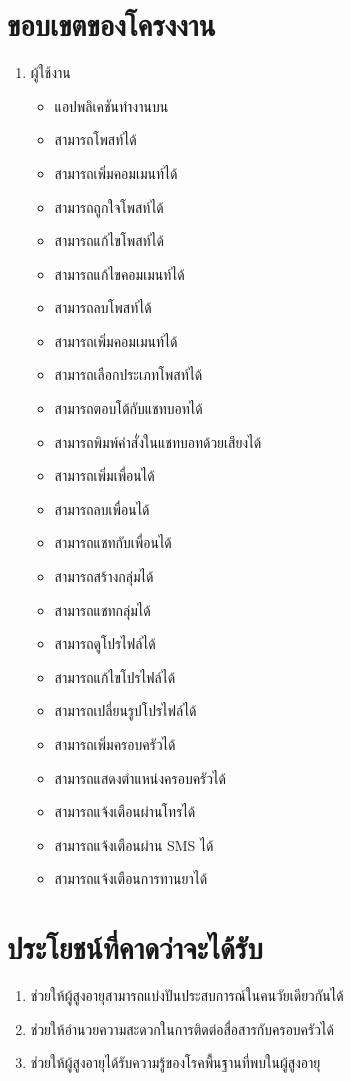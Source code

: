 \section{ขอบเขตของโครงงาน}
\begin{enumerate}[label=1.3.\arabic*]
	\item ผู้ใช้งาน
	 \begin{itemize}
		 	\item แอปพลิเคชันทำงานบน
		 	\item สามารถโพสท์ได้
		 	\item สามารถเพิ่มคอมเมนท์ได้
		 	\item สามารถถูกใจโพสท์ได้
		 	\item สามารถแก้ไขโพสท์ได้
		 	\item สามารถแก้ไขคอมเมนท์ได้
		 	\item สามารถลบโพสท์ได้
		 	\item สามารถเพิ่มคอมเมนท์ได้
		 	\item สามารถเลือกประเภทโพสท์ได้
		 	\item สามารถตอบโต้กับแชทบอทได้
		 	\item สามารถพิมพ์คำสั่งในแชทบอทด้วยเสียงได้
		 	\item สามารถเพิ่มเพื่อนได้
		 	\item สามารถลบเพื่อนได้
		 	\item สามารถแชทกับเพื่อนได้
		 	\item สามารถสร้างกลุ่มได้
		 	\item สามารถแชทกลุ่มได้
		 	\item สามารถดูโปรไฟล์ได้
		 	\item สามารถแก้ไขโปรไฟล์ได้
		 	\item สามารถเปลี่ยนรูปโปรไฟล์ได้
		 	\item สามารถเพิ่มครอบครัวได้
		 	\item สามารถแสดงตำแหน่งครอบครัวได้
		 	\item สามารถแจ้งเตือนผ่านโทรได้
		 	\item สามารถแจ้งเตือนผ่าน SMS ได้
		 	\item สามารถแจ้งเตือนการทานยาได้
	 \end{itemize}
\end{enumerate}
\section{ประโยชน์ที่คาดว่าจะได้รับ}
\begin{enumerate}
	\item ช่วยให้ผู้สูงอายุสามารถแบ่งปันประสบการณ์ในคนวัยเดียวกันได้
	\item ช่วยให้อำนวยความสะดวกในการติดต่อสื่อสารกับครอบครัวได้
	\item ช่วยให้ผู้สูงอายุได้รับความรู้ของโรคพื้นฐานที่พบในผู้สูงอายุ
\end{enumerate}
